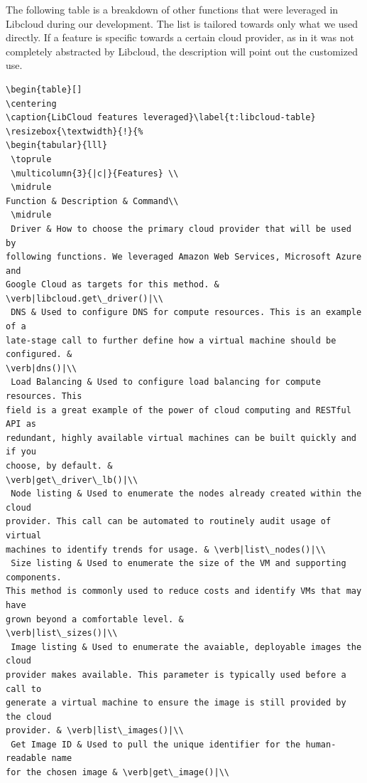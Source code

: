 The following table is a breakdown of other functions that were leveraged in
Libcloud during our development. The list is tailored towards only what we used
directly. If a feature is specific towards a certain cloud provider, as in it
was not completely abstracted by Libcloud, the description will point out the
customized use.

\begin{verbatim} 
\begin{table}[]
\centering
\caption{LibCloud features leveraged}\label{t:libcloud-table}
\resizebox{\textwidth}{!}{%
\begin{tabular}{lll}
 \toprule
 \multicolumn{3}{|c|}{Features} \\
 \midrule
Function & Description & Command\\
 \midrule
 Driver	& How to choose the primary cloud provider that will be used by
following functions. We leveraged Amazon Web Services, Microsoft Azure and
Google Cloud as targets for this method. & \verb|libcloud.get\_driver()|\\
 DNS & Used to configure DNS for compute resources. This is an example of a
late-stage call to further define how a virtual machine should be configured. &
\verb|dns()|\\
 Load Balancing & Used to configure load balancing for compute resources. This
field is a great example of the power of cloud computing and RESTful API as
redundant, highly available virtual machines can be built quickly and if you
choose, by default. &
\verb|get\_driver\_lb()|\\
 Node listing & Used to enumerate the nodes already created within the cloud
provider. This call can be automated to routinely audit usage of virtual
machines to identify trends for usage. & \verb|list\_nodes()|\\
 Size listing & Used to enumerate the size of the VM and supporting components.
This method is commonly used to reduce costs and identify VMs that may have
grown beyond a comfortable level. &
\verb|list\_sizes()|\\
 Image listing & Used to enumerate the avaiable, deployable images the cloud
provider makes available. This parameter is typically used before a call to
generate a virtual machine to ensure the image is still provided by the cloud
provider. & \verb|list\_images()|\\
 Get Image ID & Used to pull the unique identifier for the human-readable name
for the chosen image & \verb|get\_image()|\\

\end{verbatim}
